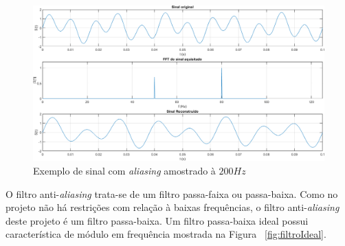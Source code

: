 \documentclass[
	12pt,				%
	openright,			%
	twoside,			%
	a4paper,			%
	english,			%
	french,				%
	spanish,			%
	brazil,				%
	]{abntex2}
\begin{document}
		\begin{figure}[H]
			\centering
			\includegraphics[width=\linewidth]{../Fotos/aliasingFs200.png}
			\caption{Exemplo de sinal com \textit{aliasing} amostrado à $200Hz$}
			\label{fig:exemploAliasing200}
		\end{figure}

		\pagebreak

		O filtro anti-\textit{aliasing} trata-se de um filtro passa-faixa
		ou passa-baixa. Como no projeto não há restrições com relação à
		baixas frequências, o filtro anti-\textit{aliasing} deste projeto
		é um filtro passa-baixa. Um filtro passa-baixa ideal possui
		característica de módulo em frequência mostrada na Figura ~\ref{fig:filtroIdeal}.
\end{document}
